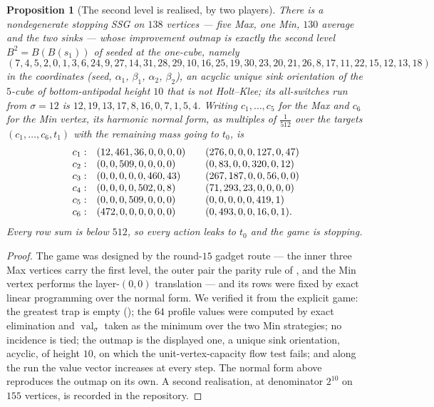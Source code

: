 \documentclass[11pt]{article}
\theoremstyle{plain}
\newtheorem{proposition}[theorem]{Proposition}
\theoremstyle{definition}
\DeclareMathOperator{\val}{val}
\begin{document}
\begin{proposition}[The second level is realised, by two players]\label{prop:b2-realised}
There is a nondegenerate stopping SSG on $138$ vertices --- five Max, one
Min, $130$ average and the two sinks --- whose improvement outmap is
exactly the second level $B^{2}=B(B(s_1))$ of  seeded at
the one-cube, namely
\[
  (7,4,5,2,0,1,3,6,24,9,27,14,31,28,29,10,16,25,19,30,23,20,21,26,8,17,11,22,15,12,13,18)
\]
in the coordinates (seed, $\alpha_1$, $\beta_1$, $\alpha_2$, $\beta_2$),
an acyclic unique sink orientation of the $5$-cube of bottom-antipodal
height $10$ that is not Holt--Klee; its all-switches run from $\sigma=12$
is $12,19,13,17,8,16,0,7,1,5,4$. Writing $c_1,\dots,c_5$ for the Max and
$c_6$ for the Min vertex, its harmonic normal form, as multiples of
$\tfrac1{512}$ over the targets $(c_1,\dots,c_6,t_1)$ with the remaining
mass going to $t_0$, is
\[
 \begin{array}{r@{\quad}l@{\qquad}l}
  c_1: & (12,461,36,0,0,0,0)     & (276,0,0,0,127,0,47)\\
  c_2: & (0,0,509,0,0,0,0)       & (0,83,0,0,320,0,12)\\
  c_3: & (0,0,0,0,0,460,43)      & (267,187,0,0,56,0,0)\\
  c_4: & (0,0,0,0,502,0,8)       & (71,293,23,0,0,0,0)\\
  c_5: & (0,0,0,509,0,0,0)       & (0,0,0,0,0,419,1)\\
  c_6: & (472,0,0,0,0,0,0)       & (0,493,0,0,16,0,1).
 \end{array}
\]
Every row sum is below $512$, so every action leaks to $t_0$ and the game
is stopping.
\end{proposition}

\begin{proof}
The game was designed by the round-$15$ gadget route --- the inner three
Max vertices carry the first level, the outer pair the parity rule of
, and the Min vertex performs the layer-$(0,0)$
translation --- and its rows were fixed by exact linear programming over
the normal form. We verified it from the explicit game: the greatest trap
is empty (); the $64$ profile values were computed by
exact elimination and $\val_\sigma$ taken as the minimum over the two Min
strategies; no incidence is tied; the outmap is the displayed one, a
unique sink orientation, acyclic, of height $10$, on which the
unit-vertex-capacity flow test fails; and along the run the value vector
increases at every step. The normal form above reproduces the outmap on
its own. A second realisation, at denominator $2^{10}$ on $155$ vertices,
is recorded in the repository.
\end{proof}
\end{document}
